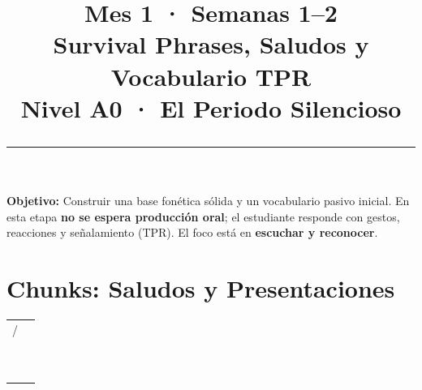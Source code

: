 \documentclass[12pt,a4paper]{article}
\title{%
  \vspace{-1cm}
  {\Huge\bfseries\textcolor{mes1}{Mes 1 · Semanas 1--2}}\\[0.3cm]
  {\Large Survival Phrases, Saludos y Vocabulario TPR}\\[0.2cm]
  {\large\color{grissuave} Nivel A0 · El Periodo Silencioso}\\[0.5cm]
  \rule{\textwidth}{1.5pt}
}
\author{}
\date{}
\begin{document}
\maketitle
\thispagestyle{empty}

\begin{cajanivel}
\textbf{Objetivo:} Construir una base fonética sólida y un vocabulario pasivo inicial. En esta etapa \textbf{no se espera producción oral}; el estudiante responde con gestos, reacciones y señalamiento (TPR). El foco está en \textbf{escuchar y reconocer}.
\end{cajanivel}

\section{Chunks: Saludos y Presentaciones}

\begin{cajachunk}
\begin{tabularx}{\textwidth}{@{} X l @{}}
\eng{Hello!} / \eng{Hi!} & \esp{¡Hola!} \\
\eng{Good morning.} & \esp{Buenos días.} \\
\eng{Good afternoon.} & \esp{Buenas tardes.} \\
\eng{Good evening.} & \esp{Buenas noches (al llegar).} \\
\eng{Good night.} & \esp{Buenas noches (al despedirse).} \\
\eng{How are you?} & \esp{¿Cómo estás?} \\
\eng{I'm fine, thank you.} & \esp{Estoy bien, gracias.} \\
\eng{I'm good. And you?} & \esp{Estoy bien. ¿Y tú?} \\
\eng{Nice to meet you.} & \esp{Mucho gusto.} \\
\eng{See you later!} & \esp{¡Hasta luego!} \\
\eng{Goodbye! / Bye!} & \esp{¡Adiós!} \\
\end{tabularx}
\end{cajachunk}
\end{document}
